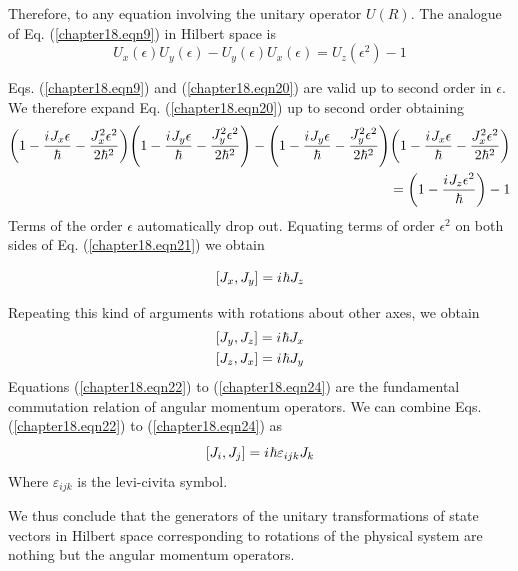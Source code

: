 Therefore, to any equation involving the unitary operator $U(R)$. The analogue of Eq. (\ref{chapter18.eqn9}) in Hilbert space is
\begin{equation}
\label{chapter18.eqn20}
U_x(\epsilon) U_y(\epsilon) - U_y(\epsilon) U_x(\epsilon) = U_z(\epsilon^2) - 1
\end{equation}

Eqs. (\ref{chapter18.eqn9}) and (\ref{chapter18.eqn20}) are valid up to second order in $\epsilon$. We therefore expand Eq. (\ref{chapter18.eqn20}) up to second order obtaining
\begin{equation}
\label{chapter18.eqn21}
\begin{split}
\qty(1 - \frac{{i\mkern1mu} J_x \epsilon}{\hbar} - \frac{J_x^2 \epsilon^2}{2 \hbar^2}) 
\qty(1 - \frac{{i\mkern1mu} J_y \epsilon}{\hbar} - \frac{J_y^2 \epsilon^2}{2 \hbar^2})
-
\qty(1 - \frac{{i\mkern1mu} J_y \epsilon}{\hbar} - \frac{J_y^2 \epsilon^2}{2 \hbar^2})
\qty(1 - \frac{{i\mkern1mu} J_x \epsilon}{\hbar} - \frac{J_x^2 \epsilon^2}{2 \hbar^2})\\
= \qty(1 - \frac{{i\mkern1mu} J_z \epsilon^2}{\hbar}) - 1
\end{split}
\end{equation}
Terms of the order $\epsilon$ automatically drop out. Equating terms of order  $\epsilon^2$ on both sides of Eq. (\ref{chapter18.eqn21}) we obtain

\begin{equation}
\label{chapter18.eqn22}
\comm{J_x}{J_y} = \iu \hbar J_z
\end{equation}

Repeating this kind of arguments with rotations about other axes, we obtain
\begin{align}
\label{chapter18.eqn23}
\comm{J_y}{J_z} = \iu \hbar J_x \\
\label{chapter18.eqn24}
\comm{J_z}{J_x} = \iu \hbar J_y
\end{align}
Equations (\ref{chapter18.eqn22}) to (\ref{chapter18.eqn24}) are the fundamental commutation relation of angular momentum operators.
We can combine Eqs. (\ref{chapter18.eqn22}) to (\ref{chapter18.eqn24}) as
\begin{equation}
	\comm{J_i}{J_j} = \iu \hbar \varepsilon_{i j k} J_k
\end{equation}
Where $\varepsilon_{i j k}$ is the levi-civita symbol.


 We thus conclude that the generators of the unitary transformations of state vectors in Hilbert space corresponding to rotations of the physical system are nothing but the angular momentum operators.




